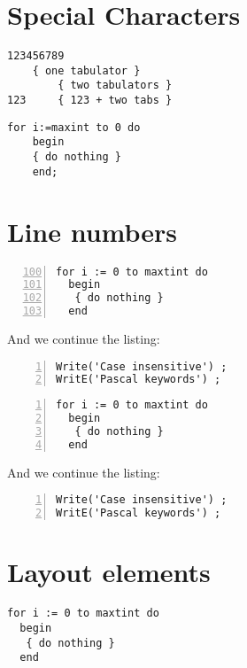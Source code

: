\documentclass{article}
\begin{document}
\section*{Special Characters}
\begin{lstlisting}[tabsize=2]
123456789
	{ one tabulator }
		{ two tabulators }
123		{ 123 + two tabs }
\end{lstlisting}


\begin{lstlisting}[showspaces=true, showtabs=true, tab=\rightarrowfill]
    for i:=maxint to 0 do
    begin
	{ do nothing }
    end;
\end{lstlisting}

\section*{Line numbers}
\begin{lstlisting}[firstnumber=100, numbers=left, stepnumber=2]
  for i := 0 to maxtint do
  begin
   { do nothing }
  end
\end{lstlisting}
And we continue the listing:
\begin{lstlisting}[firstnumber=last, numbers=left, stepnumber=2]
Write('Case insensitive') ;
WritE('Pascal keywords') ;
\end{lstlisting}

\begin{lstlisting}[name=Test, numbers=left]
  for i := 0 to maxtint do
  begin
   { do nothing }
  end
\end{lstlisting}
And we continue the listing:
\begin{lstlisting}[name=Test, numbers=left]
Write('Case insensitive') ;
WritE('Pascal keywords') ;
\end{lstlisting}

\section*{Layout elements}
\begin{lstlisting}[frame=single]
  for i := 0 to maxtint do
  begin
   { do nothing }
  end
\end{lstlisting}
\end{document}
